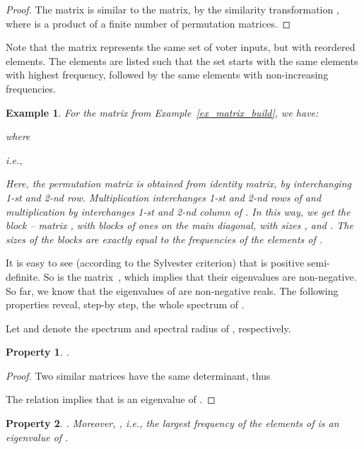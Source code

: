 \documentclass[technote, a4paper, onecolumn]{IEEEtran}  \newcommand{\avtor}{Aleksandar Simevski}
\newtheorem{property}{Property}
\newtheorem{ex}{Example}
\begin{document}
\begin{proof}\label{proof_similar}
The  matrix is similar to the 
matrix, by the similarity  transformation , where
 is a product of a finite number of permutation matrices.
\end{proof}

Note that the matrix  represents the same set of voter inputs, but with reordered elements. The elements are listed such that the set starts with the same elements with highest frequency, followed by the same elements with non-increasing  frequencies.  

\medskip
\begin{ex}\label{ex_similar}
For the matrix from Example~\ref{ex_matrix_build}, we  have:

where

i.e.,

Here, the permutation matrix  is obtained from
 identity matrix, by interchanging 1-st and 2-nd row.
Multiplication  interchanges
1-st and 2-nd rows of  and multiplication by
 interchanges 1-st and 2-nd column of
. In this way, we get the
block -- matrix , with blocks of
ones on the main diagonal, with sizes ,  and
. The sizes of the blocks are exactly equal to the frequencies of the elements of
.
\end{ex}

\medskip
It is easy to see (according to the Sylvester criterion) that  is positive semi-definite. So is the  matrix~\cite{Meyer2000}, which implies that their eigenvalues are non-negative. So far, we know that the eigenvalues of  are non-negative reals. The following properties reveal, step-by step, the whole spectrum of .



\medskip
Let  and  denote the spectrum and spectral radius of , respectively.

\medskip
\begin{property}\label{prop_nula} .\end{property}

\begin{proof}\label{proof_nula}
Two similar matrices have the same determinant, thus

The relation  implies that  is an eigenvalue
of .
\end{proof}

\medskip
\begin{property}\label{theo_max}
. Moreover, , i.e., the largest frequency of the elements of  is an eigenvalue of .
\end{property}
\end{document}
